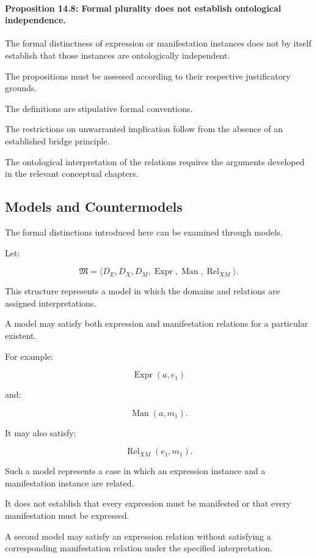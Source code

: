 \paragraph{Proposition 14.8: Formal plurality does not establish ontological independence.}

The formal distinctness
of expression or
manifestation instances
does not by itself
establish that those
instances are ontologically
independent.

The propositions must
be assessed according
to their respective
justificatory grounds.

The definitions are
stipulative formal
conventions.

The restrictions on
unwarranted implication
follow from the absence
of an established bridge
principle.

The ontological interpretation
of the relations requires
the arguments developed
in the relevant conceptual
chapters.

\subsection{Models and Countermodels}

The formal distinctions
introduced here can be
examined through models.

Let:

\[
    \mathfrak{M}
    =
    \langle
        D_E,D_X,D_M,
        \operatorname{Expr},
        \operatorname{Man},
        \operatorname{Rel}_{XM}
    \rangle.
\]

This structure represents
a model in which the
domains and relations
are assigned interpretations.

A model may satisfy
both expression and
manifestation relations
for a particular existent.

For example:

\[
    \operatorname{Expr}(a,e_1)
\]

and:

\[
    \operatorname{Man}(a,m_1).
\]

It may also satisfy:

\[
    \operatorname{Rel}_{XM}(e_1,m_1).
\]

Such a model represents
a case in which an
expression instance
and a manifestation
instance are related.

It does not establish
that every expression
must be manifested
or that every manifestation
must be expressed.

A second model may
satisfy an expression
relation without satisfying
a corresponding manifestation
relation under the specified
interpretation.

